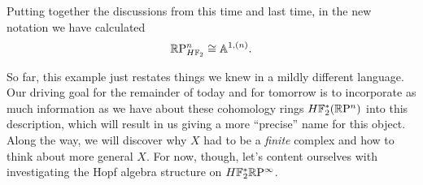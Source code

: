 \begin{example}
Putting together the discussions from this time and last time, in the new notation we have calculated \[\mathbb R\mathrm P^n_{H\mathbb F_2} \cong \mathbb A^{1, (n)}.\]
\end{example}

So far, this example just restates things we knew in a mildly different language.  Our driving goal for the remainder of today and for tomorrow is to incorporate as much information as we have about these cohomology rings $H\mathbb F_2^* (\mathbb R\mathrm P^n)$ into this description, which will result in us giving a more ``precise'' name for this object.  Along the way, we will discover why $X$ had to be a \emph{finite} complex and how to think about more general $X$.  For now, though, let's content ourselves with investigating the Hopf algebra structure on $H\mathbb F_2^* \mathbb R\mathrm P^\infty$.

